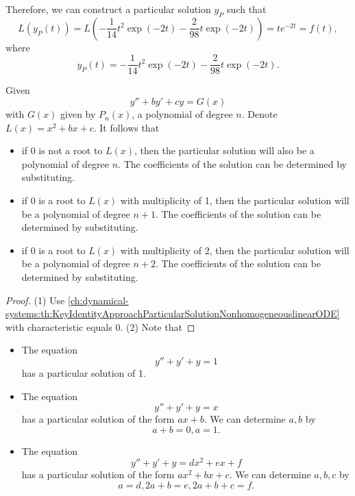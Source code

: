 \begin{refsection}
\begin{example}
	Therefore, we can construct a particular solution $y_P$ such that 
	$$L(y_P(t)) = L(-\frac{1}{14}t^2\exp(-2t)-\frac{2}{98}t\exp(-2t)) =  te^{-2t} = f(t),$$
	where 
	$$y_P(t)=-\frac{1}{14}t^2\exp(-2t)-\frac{2}{98}t\exp(-2t). $$
\end{example}

\begin{corollary}
	Given $$y'' + by' + cy = G(x)$$ with $G(x)$ given by $P_n(x)$, a polynomial of degree $n$. Denote $L(x) = x^2+bx+c$.
It follows that
\begin{itemize}
	\item if $0$ is not a root to $L(x)$, then the particular solution will also be a polynomial of degree $n$. The coefficients of the solution can be determined by substituting. 
	\item if $0$ is a root to $L(x)$ with multiplicity of 1, then the particular solution will be a polynomial of degree $n+1$. The coefficients of the solution can be determined by substituting.
	\item if $0$ is a root to $L(x)$ with multiplicity of 2, then the particular solution will be a polynomial of degree $n+2$. The coefficients of the solution can be determined by substituting.
\end{itemize}
\end{corollary}
\begin{proof}
(1)	Use \autoref{ch:dynamical-systems:th:KeyIdentityApproachParticularSolutionNonhomogeneouslinearODE} with characteristic equals 0.
(2) Note that  
\end{proof}


\begin{example}\hfill
\begin{itemize}
	\item The equation
	$$y'' + y' + y = 1$$
	has a particular solution of 1.
	\item The equation
	$$y'' + y' + y = x$$
	has a particular solution of the form $ax + b$.
	We can determine $a,b$ by
	$$a + b = 0, a = 1.$$
	\item The equation
	$$y'' + y' + y = dx^2 + ex + f$$
	has a particular solution of the form $ax^2 + bx + c$.
	We can determine $a,b,c$ by
	$$a= d, 2a+b = e, 2a+b + c = f.$$
\end{itemize}	
\end{example}


\end{refsection}
